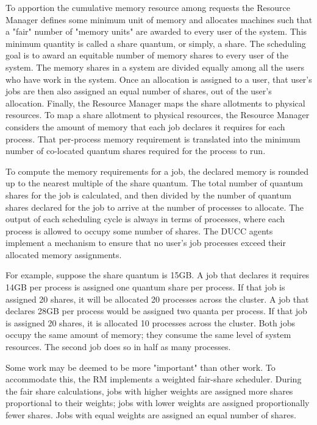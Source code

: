     To apportion the cumulative memory resource among requests the Resource Manager
    defines some minimum unit of memory and allocates machines such that a "fair" number of "memory
    units" are awarded to every user of the system. This minimum quantity is called a share quantum,
    or simply, a share. The scheduling goal is to award an equitable number of memory shares to
    every user of the system.  The memory shares in a system are divided equally among all the users
    who have work in the system. Once an allocation is assigned to a user, that user's jobs are then
    also assigned an equal number of shares, out of the user's allocation. Finally, the Resource
    Manager maps the share allotments to physical resources.  To map a share allotment to physical
    resources, the Resource Manager considers the amount of memory that each job declares it
    requires for each process. That per-process memory requirement is translated into the minimum
    number of co-located quantum shares required for the process to run.
    
    To compute the memory requirements for a job, the declared memory is rounded up to the nearest
    multiple of the share quantum.  The total number of quantum shares for the job is calculated,
    and then divided by the number of quantum shares declared for the job to arrive at the number of
    processes to allocate.  The output of each scheduling cycle is always in terms of processes,
    where each process is allowed to occupy some number of shares. The DUCC agents implement a
    mechanism to ensure that no user's job processes exceed their allocated memory assignments.

    For example, suppose the share quantum is 15GB. A job that declares it requires 14GB per process 
    is assigned one quantum share per process. If that job is assigned 20 shares, it will be allocated 20 
    processes across the cluster. A job that declares 28GB per process would be assigned two quanta 
    per process. If that job is assigned 20 shares, it is allocated 10 processes across the cluster. Both     
    jobs occupy the same amount of memory; they consume the same level of system resources. The 
    second job does so in half as many processes.
    
    
    Some work may be deemed to be more "important" than other work. To accommodate this, the RM
    implements a weighted fair-share scheduler.  During the fair share 
    calculations, jobs with higher weights are assigned more shares proportional to their weights; jobs 
    with lower weights are assigned proportionally fewer shares. Jobs with equal weights are assigned 
    an equal number of shares. 
    
